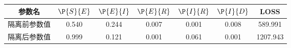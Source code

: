 \begin{tabular}{ccccccc}
\hline
参数名&$\P{S}{E}$&$\P{E}{I}$&$\P{E}{R}$&$\P{I}{R}$&$\P{I}{D}$&LOSS\\
\hline
隔离前参数值&0.540&0.244&0.007&0.001&0.008&589.991\\
隔离后参数值&0.999&0.121&0.001&0.061&0.001&1207.943\\
\hline
\end{tabular}